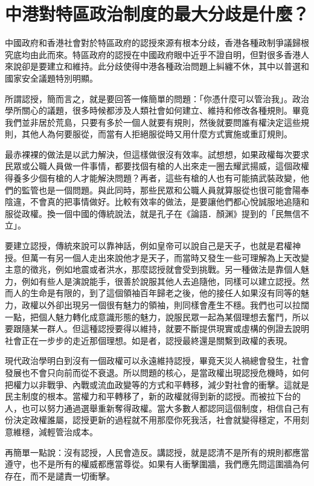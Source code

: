 \section{中港對特區政治制度的最大分歧是什麼？}

中國政府和香港社會對於特區政府的認授來源有根本分歧，香港各種政制爭議歸根究底均由此而來。特區政府的認授在中國政府眼中近乎不證自明，但對很多香港人來說卻是要建立和維持。此分歧使得中港各種政治問題上糾纏不休，其中以普選和國家安全議題特別明顯。

所謂認授，簡而言之，就是要回答一條簡單的問題：「你憑什麼可以管治我」。政治學所關心的議題，很多時候都涉及人類社會如何建立、維持和修改各種規則。畢竟我們並非居於荒島，只要有多於一個人就要有規則，然後就要問誰有權決定這些規則，其他人為何要服從，而當有人拒絕服從時又用什麼方式實施或重訂規則。

最赤裸裸的做法是以武力解決，但這樣做很沒有效率。試想想，如果政權每次要求民眾或公職人員做一件事情，都要找個有槍的人出來走一圈去耀武揚威，這個政權得養多少個有槍的人才能解決問題？再者，這些有槍的人也有可能搞武裝政變，他們的監管也是一個問題。與此同時，那些民眾和公職人員就算服從也很可能會陽奉陰違，不會真的把事情做好。比較有效率的做法，是要讓他們都心悅誠服地追隨和服從政權。換一個中國的傳統說法，就是孔子在《論語．顏渊》提到的「民無信不立」。

要建立認授，傳統來說可以靠神話，例如皇帝可以說自己是天子，也就是君權神授。但萬一有另一個人走出來說他才是天子，而當時又發生一些可理解為上天改變主意的徵兆，例如地震或者洪水，那麼認授就會受到挑戰。另一種做法是靠個人魅力，例如有些人是演說能手，很善於說服其他人去追隨他，同樣可以建立認授。然而人的生命是有限的，到了這個領袖百年歸老之後，他的接任人如果沒有同等的魅力，政權以外卻出現另一個很有魅力的領袖，則同樣會產生不穩。我們也可以拉闊一點，把個人魅力轉化成意識形態的魅力，說服民眾一起為某個理想去奮鬥，所以要跟隨某一群人。但這種認授要得以維持，就要不斷提供現實或虛構的例證去說明社會正在一步步的走近那個理想。如是者，認授最終還是關繫到政權的表現。

現代政治學明白到沒有一個政權可以永遠維持認授，畢竟天災人禍總會發生，社會發展也不會只向前而從不衰退。所以問題的核心，是當政權出現認授危機時，如何把權力以非戰爭、內戰或流血政變等的方式和平轉移，減少對社會的衝擊。這就是民主制度的根本。當權力和平轉移了，新的政權就得到新的認授。而被拉下台的人，也可以努力通過選舉重新奪得政權。當大多數人都認同這個制度，相信自己有份決定政權誰屬，認授更新的過程就不用那麼你死我活，社會就變得穩定，不用刻意維穩，減輕管治成本。

再簡單一點說：沒有認授，人民會造反。講認授，就是認清不是所有的規則都應當遵守，也不是所有的權威都應當尊從。如果有人衝擊圍牆，我們應先問這圍牆為何存在，而不是譴責一切衝擊。

